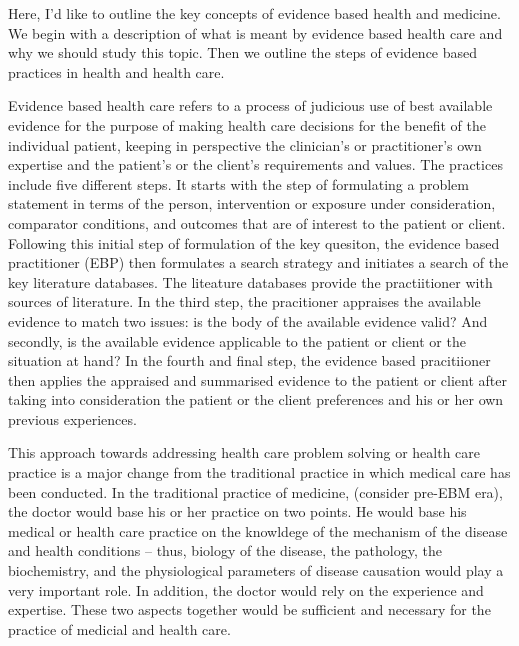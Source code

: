 Here, I'd like to outline the key concepts of evidence based health and medicine. We begin with a description of what is meant by evidence based health care and why we should study this topic. Then we outline the steps of evidence based practices in health and health care. 

Evidence based health care refers to a process of judicious use of best available evidence for the purpose of making health care decisions for the benefit of the individual patient, keeping in perspective the clinician's or practitioner's own expertise and the patient's or the client's requirements and values. The practices include five different steps. It starts with the step of formulating a problem statement in terms of the person, intervention or exposure under consideration, comparator conditions, and outcomes that are of interest to the patient or client. Following this initial step of formulation of the key quesiton, the evidence based practitioner (EBP) then formulates a search strategy and initiates a search of the key literature databases. The liteature databases provide the practiitioner with sources of literature. In the third step, the pracitioner appraises the available evidence to match two issues: is the body of the available evidence valid? And secondly, is the available evidence applicable to the patient or client or the situation at hand? In the fourth and final step, the evidence based pracitiioner then applies the appraised and summarised evidence to the patient or client after taking into consideration the patient or the client preferences and his or her own previous experiences. 

This approach towards addressing health care problem solving or health care practice is a major change from the traditional practice in which medical care has been conducted. In the traditional practice of medicine, (consider pre-EBM era), the doctor would base his or her practice on two points. He would base his medical or health care practice on the knowldege of the mechanism of the disease and health conditions -- thus, biology of the disease, the pathology, the biochemistry, and the physiological parameters of disease causation would play a very important role. In addition, the doctor would rely on the experience and expertise. These two aspects together would be sufficient and necessary for the practice of medicial and health care. 
